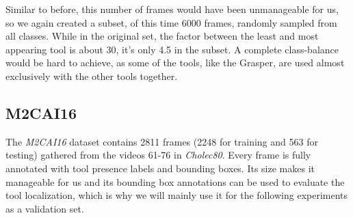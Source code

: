 Similar to before, this number of frames would have been unmanageable for us, so we again created a subset, of this time 6000 frames, randomly sampled from all classes. While in the original set, the factor between the least and most appearing tool is about 30, it's only 4.5 in the subset. A complete class-balance would be hard to achieve, as some of the tools, like the Grasper, are used almost exclusively with the other tools together.


\subsection{M2CAI16}

The \emph{M2CAI16} dataset contains \num{2811} frames (\num{2248} for training and \num{563} for testing) gathered from the videos 61-76 in \emph{Cholec80}. Every frame is fully annotated with tool presence labels and bounding boxes. Its size makes it manageable for us and its bounding box annotations can be used to evaluate the tool localization, which is why we will mainly use it for the following experiments as a validation set.


